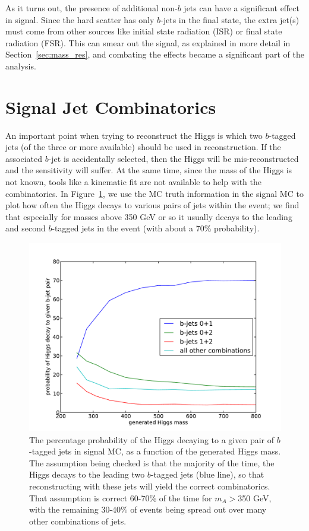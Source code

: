 As it turns out, the presence of additional non-$b$ jets can have a significant 
effect in signal.  Since the hard scatter has only $b$-jets in the final state, the
extra jet(s) must come from other sources like initial state radiation (ISR) or 
final state radiation (FSR).  This can smear out the signal, as explained in more detail
in Section~\ref{sec:mass_res}, and combating the effects became a significant part of the
analysis.


\section{Signal Jet Combinatorics}
\label{sec:combinatorics}
An important point when trying to reconstruct the Higgs is which two $b$-tagged jets (of the
three or more available) should be used in reconstruction.  If the associated $b$-jet is accidentally
selected, then the Higgs will be mis-reconstructed and the sensitivity will suffer.  At the same time,
since the mass of the Higgs is not known, tools like a kinematic fit are not available to
help with the combinatorics.  In Figure~\ref{fig:combinatorics}, we use the MC truth
information in the signal MC to plot how often the Higgs decays to various pairs of jets
within the event; we find that especially for masses above 350 GeV or so it usually decays to
the leading and second $b$-tagged jets in the event (with about a 70\% probability).
    
\begin{figure}[hbt]
  \center
  \includegraphics[width=0.78\linewidth]{SignalKin/combinatorics.pdf}
  \caption{The percentage probability of the Higgs decaying to a given pair of $b$-tagged jets in signal MC,
    as a function of the generated Higgs mass.  The assumption being checked is that the majority of
    the time, the Higgs decays to the leading two $b$-tagged jets (blue line), so that reconstructing with these jets
    will yield the correct combinatorics.  That assumption is correct 60-70\% of the time for $m_A>$350 GeV,
    with the remaining 30-40\% of events being spread out over many other combinations of jets.
    \label{fig:combinatorics}}
\end{figure}
                
